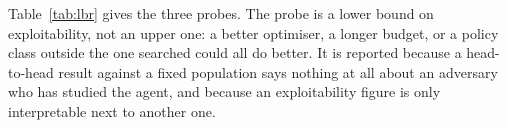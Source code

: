 \begin{table}[ht]
\centering
\caption{Local best-response probe. Each row fits a fresh policy, inside the same
policy class and with the same optimiser, whose only objective is to beat the
frozen policy named. The win rate is what that adversary achieved; lower is
better for the frozen policy.}
\label{tab:lbr}
\small

\end{table}

Table~\ref{tab:lbr} gives the three probes. The probe is a lower bound on
exploitability, not an upper one: a better
optimiser, a longer budget, or a policy class outside the one searched could all
do better. It is reported because a head-to-head result against a fixed
population says nothing at all about an adversary who has studied the agent, and
because an exploitability figure is only interpretable next to another one.
